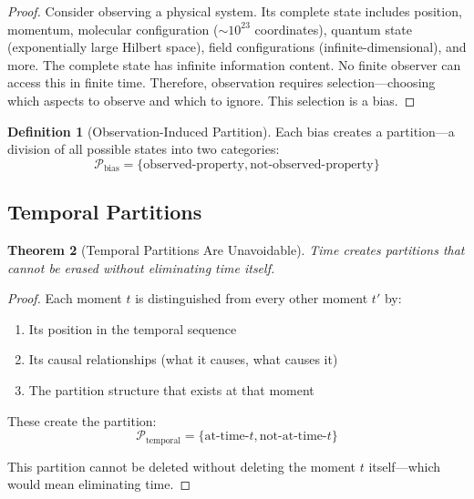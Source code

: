 \documentclass[twocolumn,10pt,a4paper]{article}
\newtheorem{theorem}{Theorem}[section]
\theoremstyle{definition}
\newtheorem{definition}[theorem]{Definition}
\theoremstyle{remark}
\begin{document}
\begin{proof}
Consider observing a physical system. Its complete state includes position, momentum, molecular configuration ($\sim 10^{23}$ coordinates), quantum state (exponentially large Hilbert space), field configurations (infinite-dimensional), and more. The complete state has infinite information content. No finite observer can access this in finite time. Therefore, observation requires selection---choosing which aspects to observe and which to ignore. This selection is a bias.
\end{proof}

\begin{definition}[Observation-Induced Partition]
Each bias creates a partition---a division of all possible states into two categories:
\begin{equation}
    \mathcal{P}_{\text{bias}} = \{\text{observed-property}, \text{not-observed-property}\}
\end{equation}
\end{definition}

\subsection{Temporal Partitions}

\begin{theorem}[Temporal Partitions Are Unavoidable]
\label{thm:temporal_partition}
Time creates partitions that cannot be erased without eliminating time itself.
\end{theorem}

\begin{proof}
Each moment $t$ is distinguished from every other moment $t'$ by:
\begin{enumerate}
    \item Its position in the temporal sequence
    \item Its causal relationships (what it causes, what causes it)
    \item The partition structure that exists at that moment
\end{enumerate}

These create the partition:
\begin{equation}
    \mathcal{P}_{\text{temporal}} = \{\text{at-time-}t, \text{not-at-time-}t\}
\end{equation}

This partition cannot be deleted without deleting the moment $t$ itself---which would mean eliminating time.
\end{proof}
\end{document}

